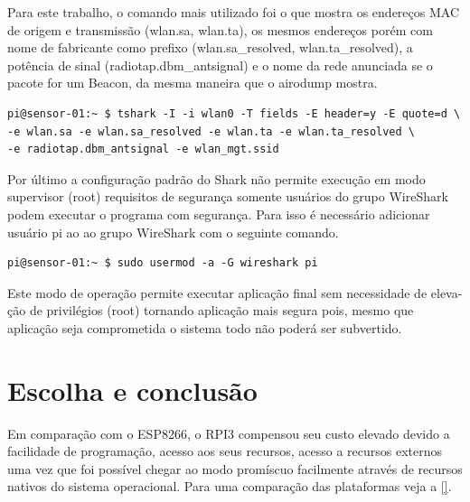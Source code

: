 Para este trabalho, o comando mais utilizado foi o que mostra os endereços MAC
de origem e transmissão (wlan.sa, wlan.ta), os mesmos endereços porém com nome de
fabricante como prefixo (wlan.sa\_resolved, wlan.ta\_resolved), a potência de sinal (radiotap.dbm\_antsignal)
e o nome da rede anunciada se o pacote for um Beacon, da mesma
maneira que o airodump mostra.

\begin{verbatim}
pi@sensor-01:~ $ tshark -I -i wlan0 -T fields -E header=y -E quote=d \
-e wlan.sa -e wlan.sa_resolved -e wlan.ta -e wlan.ta_resolved \
-e radiotap.dbm_antsignal -e wlan_mgt.ssid
\end{verbatim}

Por último a configuração padrão do Shark não permite execução em modo supervisor
(root) requisitos de segurança somente usuários do grupo WireShark podem
executar o programa com segurança. Para isso é necessário adicionar usuário pi ao ao
grupo WireShark com o seguinte comando.

\begin{verbatim}
pi@sensor-01:~ $ sudo usermod -a -G wireshark pi
\end{verbatim}

Este modo de operação permite executar aplicação final sem necessidade de eleva-
ção de privilégios (root) tornando aplicação mais segura pois, mesmo que aplicação seja
comprometida o sistema todo não poderá ser subvertido.

\section{Escolha e conclusão}
\label{sec:escolha-plataforma}

Em comparação com o ESP8266, o RPI3 compensou seu custo elevado devido a
facilidade de programação, acesso aos seus recursos, acesso a recursos externos uma
vez que foi possível chegar ao modo promíscuo facilmente através de recursos nativos do
sistema operacional. Para uma comparação das plataformas veja a \autoref{}.

